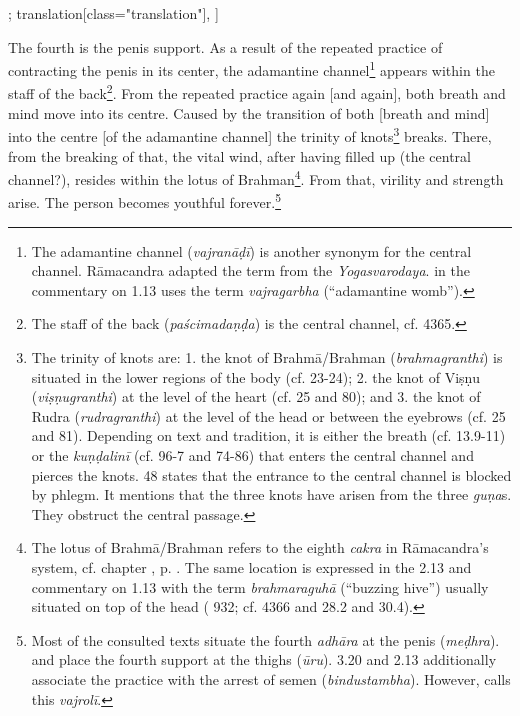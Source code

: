 \begin{alignment}[
  texts=edition[class="edition"];
  translation[class="translation"],
  ]
\begin{translation}
\begin{tlate}[p30_02]
      The fourth is the penis support. As a result of the repeated practice of contracting the penis in its center, the adamantine channel\footnote{The adamantine channel (\textit{vajranāḍī}) is another synonym for the central channel. Rāmacandra adapted the term from the \textit{Yogasvarodaya}.  in the commentary on 1.13 uses the term \textit{vajragarbha} (``adamantine womb'').} appears within the staff of the back\footnote{The staff of the back (\textit{paścimadaṇḍa}) is the central channel, cf.  4365.}. From the repeated practice again [and again], both breath and mind move into its centre. Caused by the transition of both [breath and mind] into the centre [of the adamantine channel] the trinity of knots\footnote{The trinity of knots are: 1. the knot of Brahmā/Brahman (\textit{brahmagranthi}) is situated in the lower regions of the body (cf.  23-24); 2. the knot of Viṣṇu (\textit{viṣṇugranthi}) at the level of the heart (cf.  25 and  80); and 3. the knot of Rudra (\textit{rudragranthi}) at the level of the head or between the eyebrows (cf.  25 and  81). Depending on text and tradition, it is either the breath (cf.  13.9-11) or the \textit{kuṇḍalinī} (cf.  96-7 and  74-86) that enters the central channel and pierces the knots.  48 states that the entrance to the central channel is blocked by phlegm. It mentions that the three knots have arisen from the three \textit{guṇa}s. They obstruct the central passage.} breaks. There, from the breaking of that, the vital wind, after having filled up (the central channel?), resides within the lotus of Brahman\footnote{The lotus of Brahmā/Brahman refers to the eighth \textit{cakra} in Rāmacandra's system, cf. chapter , p. \pageref{cakra8}. The same location is expressed in the  2.13 and  commentary on 1.13 with the term \textit{brahmaraguhā} (``buzzing hive'') usually situated on top of the head ( 932; cf.  4366 and  28.2 and 30.4).}. From that, virility and strength arise. The person becomes youthful forever.\footnote{Most of the consulted texts situate the fourth \textit{adhāra} at the penis (\textit{meḍhra}).  and  place the fourth support at the thighs (\textit{ūru}).  3.20 and  2.13 additionally associate the practice with the arrest of semen (\textit{bindustambha}). However,  calls this \textit{vajrolī}.}
      

\end{tlate}
\end{translation}
\end{alignment}
